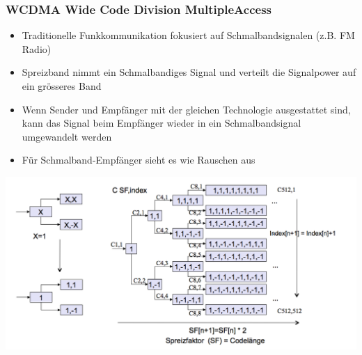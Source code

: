 \subsubsection{WCDMA Wide Code Division MultipleAccess}
\begin{minipage}{0.5\linewidth}
\begin{itemize}
\item Traditionelle Funkkommunikation fokusiert auf Schmalbandsignalen (z.B. FM Radio)
\item Spreizband nimmt ein Schmalbandiges Signal und verteilt die Signalpower auf ein grösseres Band
\item Wenn Sender und Empfänger mit der gleichen Technologie ausgestattet sind, kann das Signal beim Empfänger wieder in ein Schmalbandsignal umgewandelt werden
\item Für Schmalband-Empfänger sieht es wie Rauschen aus 
\end{itemize}
\end{minipage}
\begin{minipage}{0.5\linewidth}
\includegraphics[width = \linewidth]{./Pics/UMTSCH3}
\end{minipage}

